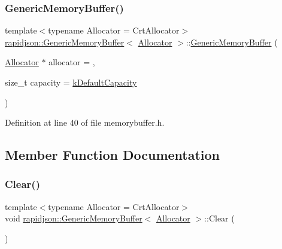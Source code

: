 \subsubsection{\texorpdfstring{GenericMemoryBuffer()}{GenericMemoryBuffer()}}
{\footnotesize\ttfamily template$<$typename Allocator  = Crt\+Allocator$>$ \\
\mbox{\hyperlink{structrapidjson_1_1_generic_memory_buffer}{rapidjson\+::\+Generic\+Memory\+Buffer}}$<$ \mbox{\hyperlink{classrapidjson_1_1_allocator}{Allocator}} $>$\+::\mbox{\hyperlink{structrapidjson_1_1_generic_memory_buffer}{Generic\+Memory\+Buffer}} (\begin{DoxyParamCaption}\item[{\mbox{\hyperlink{classrapidjson_1_1_allocator}{Allocator}} $\ast$}]{allocator = {},  }\item[{size\+\_\+t}]{capacity = {\ttfamily \mbox{\hyperlink{structrapidjson_1_1_generic_memory_buffer_abaa207fb3f94da48b0c91755828f98b3}{k\+Default\+Capacity}}} }\end{DoxyParamCaption})}



Definition at line 40 of file memorybuffer.\+h.


\begin{DoxyCode}{0}

\end{DoxyCode}


\subsection{Member Function Documentation}
\mbox{\label{structrapidjson_1_1_generic_memory_buffer_a1b2639889f687f0f6f1b90181918f273}} 
\subsubsection{\texorpdfstring{Clear()}{Clear()}}
{\footnotesize\ttfamily template$<$typename Allocator  = Crt\+Allocator$>$ \\
void \mbox{\hyperlink{structrapidjson_1_1_generic_memory_buffer}{rapidjson\+::\+Generic\+Memory\+Buffer}}$<$ \mbox{\hyperlink{classrapidjson_1_1_allocator}{Allocator}} $>$\+::Clear (\begin{DoxyParamCaption}{ }\end{DoxyParamCaption})}



